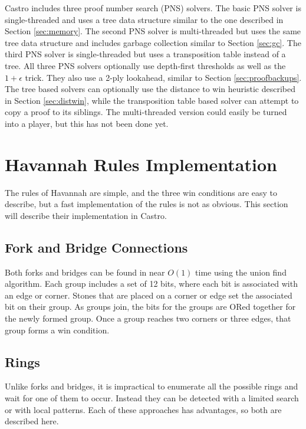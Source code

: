 Castro includes three proof number search (PNS) solvers. The basic PNS solver is single-threaded and uses a tree data structure similar to the one described in Section \ref{sec:memory}. The second PNS solver is multi-threaded but uses the same tree data structure and includes garbage collection similar to Section \ref{sec:gc}. The third PNS solver is single-threaded but uses a transposition table instead of a tree. All three PNS solvers optionally use depth-first thresholds\cite{nagai1999-DFPN} as well as the $1+\epsilon$ trick\cite{pawlewicz2007epsilon}. They also use a 2-ply lookahead, similar to Section \ref{sec:proofbackups}. The tree based solvers can optionally use the distance to win heuristic described in Section \ref{sec:distwin}, while the transposition table based solver can attempt to copy a proof to its siblings. The multi-threaded version could easily be turned into a player, but this has not been done yet.


\section{Havannah Rules Implementation}\label{sec:impl}

The rules of Havannah are simple, and the three win conditions are easy to describe, but a fast implementation of the rules is not as obvious. This section will describe their implementation in Castro.

\subsection{Fork and Bridge Connections}

Both forks and bridges can be found in near $O(1)$ time using the union find algorithm. Each group includes a set of 12 bits, where each bit is associated with an edge or corner. Stones that are placed on a corner or edge set the associated bit on their group. As groups join, the bits for the groups are ORed together for the newly formed group. Once a group reaches two corners or three edges, that group forms a win condition.

\subsection{Rings}\label{sec:ringimpl}

Unlike forks and bridges, it is impractical to enumerate all the possible rings and wait for one of them to occur. Instead they can be detected with a limited search or with local patterns. Each of these approaches has advantages, so both are described here.


